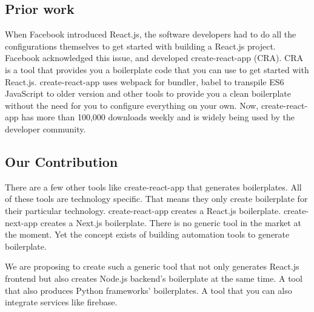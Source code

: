 \subsection{Prior work}

When Facebook introduced React.js, the software developers had to do all the configurations themselves to get started with building a React.js project. Facebook acknowledged this issue, and developed create-react-app (CRA). CRA is a tool that provides you a boilerplate code that you can use to get started with React.js.  create-react-app uses webpack for bundler, babel to transpile ES6 JavaScript to older version and other tools to provide you a clean boilerplate without the need for you to configure everything on your own. Now, create-react-app has more than 100,000 downloads weekly and is widely being used by the developer community.

\subsection{Our Contribution}

There are a few other tools like create-react-app that generates boilerplates. All of these tools are technology specific. That means they only create boilerplate for their particular technology. create-react-app creates a React.js boilerplate. create-next-app creates a Next.js boilerplate. There is no generic tool in the market at the moment. Yet the concept exists of building automation tools to generate boilerplate.

We are proposing to create such a generic tool that not only generates React.js frontend but also creates Node.js backend’s boilerplate at the same time. A tool that also produces Python frameworks’ boilerplates. A tool that you can also integrate services like firebase.

